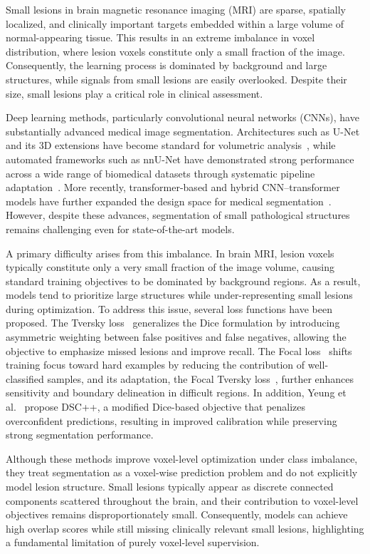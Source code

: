 Small lesions in brain magnetic resonance imaging (MRI) are sparse,
spatially localized, and clinically important targets embedded within a
large volume of normal-appearing tissue. This results in an extreme
imbalance in voxel distribution, where lesion voxels constitute only a
small fraction of the image. Consequently, the learning process is
dominated by background and large structures, while signals from small
lesions are easily overlooked. Despite their size, small lesions play a
critical role in clinical assessment.

Deep learning methods, particularly convolutional neural networks (CNNs),
have substantially advanced medical image segmentation. Architectures
such as U-Net and its 3D extensions have become standard for volumetric
analysis~\cite{navab_u-net_2015}, while automated frameworks such as
nnU-Net have demonstrated strong performance across a wide range of
biomedical datasets through systematic pipeline
adaptation~\cite{isensee_nnu-net_2021}. More recently, transformer-based
and hybrid CNN--transformer models have further expanded the design space
for medical segmentation~\cite{hatamizadeh_unetr_2021,
hatamizadeh_swin_2022}. However, despite these advances, segmentation of
small pathological structures remains challenging even for
state-of-the-art models.

A primary difficulty arises from this imbalance. In brain MRI, lesion
voxels typically constitute only a very small fraction of the image
volume, causing standard training objectives to be dominated by
background regions. As a result, models tend to prioritize large
structures while under-representing small lesions during optimization.
To address this issue, several loss functions have been proposed. The
Tversky loss~\cite{salehi_tversky_2017} generalizes the Dice formulation
by introducing asymmetric weighting between false positives and false
negatives, allowing the objective to emphasize missed lesions and improve
recall. The Focal loss~\cite{lin_focal_2017} shifts training focus toward
hard examples by reducing the contribution of well-classified samples,
and its adaptation, the Focal Tversky
loss~\cite{abraham_novel_2019}, further enhances sensitivity and boundary
delineation in difficult regions. In addition, Yeung et
al.~\cite{yeung_calibrating_2023} propose DSC++, a modified Dice-based
objective that penalizes overconfident predictions, resulting in improved
calibration while preserving strong segmentation performance.

Although these methods improve voxel-level optimization under class
imbalance, they treat segmentation as a voxel-wise prediction problem and
do not explicitly model lesion structure. Small lesions typically appear
as discrete connected components scattered throughout the brain, and
their contribution to voxel-level objectives remains disproportionately
small. Consequently, models can achieve high overlap scores while still
missing clinically relevant small lesions, highlighting a fundamental
limitation of purely voxel-level supervision.

